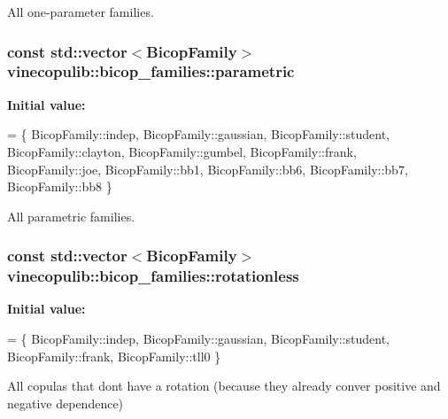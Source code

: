All one-\/parameter families. 

\subsubsection[{\texorpdfstring{parametric}{parametric}}]{\setlength{\rightskip}{0pt plus 5cm}const std\+::vector$<${\bf Bicop\+Family}$>$ vinecopulib\+::bicop\+\_\+families\+::parametric}\hypertarget{namespacevinecopulib_1_1bicop__families_a76d66bb6cb03ae4de1cef3d1ed70ac16}{}\label{namespacevinecopulib_1_1bicop__families_a76d66bb6cb03ae4de1cef3d1ed70ac16}
{\bfseries Initial value\+:}
\begin{DoxyCode}
= \{
            BicopFamily::indep,
            BicopFamily::gaussian,
            BicopFamily::student,
            BicopFamily::clayton,
            BicopFamily::gumbel,
            BicopFamily::frank,
            BicopFamily::joe,
            BicopFamily::bb1, 
            BicopFamily::bb6, 
            BicopFamily::bb7, 
            BicopFamily::bb8
        \}
\end{DoxyCode}


All parametric families. 

\subsubsection[{\texorpdfstring{rotationless}{rotationless}}]{\setlength{\rightskip}{0pt plus 5cm}const std\+::vector$<${\bf Bicop\+Family}$>$ vinecopulib\+::bicop\+\_\+families\+::rotationless}\hypertarget{namespacevinecopulib_1_1bicop__families_ac221bc84c32d2836692ed40d89439928}{}\label{namespacevinecopulib_1_1bicop__families_ac221bc84c32d2836692ed40d89439928}
{\bfseries Initial value\+:}
\begin{DoxyCode}
= \{
            BicopFamily::indep, 
            BicopFamily::gaussian, 
            BicopFamily::student, 
            BicopFamily::frank, 
            BicopFamily::tll0
        \}
\end{DoxyCode}
All copulas that don\textquotesingle{}t have a rotation (because they already conver positive and negative dependence) 
